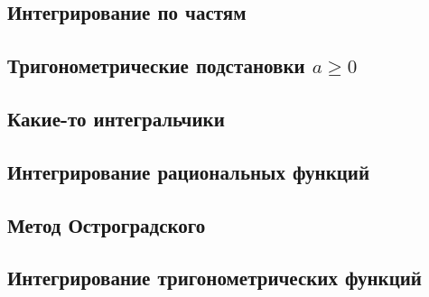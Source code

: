 \documentclass[main]{subfiles}
\begin{document}
    \begin{Example}

    \end{Example}

    \begin{Example}

    \end{Example}

    \begin{Example}

    \end{Example}

    \begin{Example}

    \end{Example}

    \begin{Example}

    \end{Example}

    \begin{Example}

    \end{Example}

    \subsection{Интегрирование по частям}

    \subsection{Тригонометрические подстановки $a \geq 0$}

    \subsection{Какие-то интегральчики}

    \subsection{Интегрирование рациональных функций}

    \subsection{Метод Остроградского}

    \subsection{Интегрирование тригонометрических функций}
\end{document}
